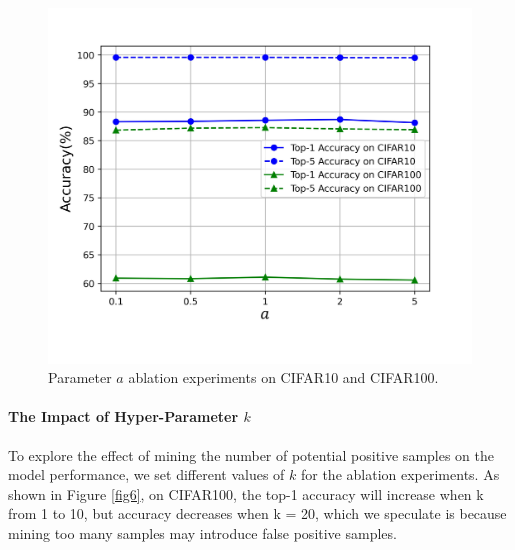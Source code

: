 \documentclass[review]{elsarticle}
\begin{document}
\begin{figure}[!t]
\centering
\includegraphics[scale=0.35]{figure8.jpg}
\vspace{-2.5em}
\caption{Parameter $ a$ ablation experiments on CIFAR10 and CIFAR100. }
\label{fig7}
\end{figure}



\paragraph{The Impact of Hyper-Parameter $k$}
To explore the effect of mining the number of potential positive samples on the model performance, we set different values of $k$ for the ablation experiments. As shown in Figure \ref{fig6}, on CIFAR100, the top-1 accuracy will increase when k from 1 to 10, but accuracy decreases when k = 20, which we speculate is because mining too many samples may introduce false positive samples.
\end{document}
